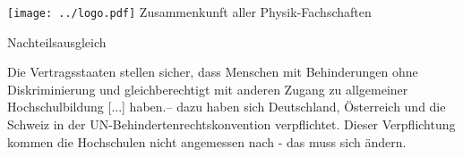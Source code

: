 \documentclass[DIV=calc]{scrartcl}
\let\oldgrqq=\grqq
\def\grqq{\oldgrqq\xspace}
\begin{document}
\hspace{0.87\textwidth}
\begin{minipage}{120pt}
\vspace{-1.8cm}
\texttt{[image: ../logo.pdf]}
\centering
\small Zusammenkunft aller Physik-Fachschaften
\end{minipage}

\begin{center}
  \huge{Nachteilsausgleich}\vspace{.25\baselineskip}\\
  \normalsize
\end{center}
\vspace{1cm}





\glqq Die Vertragsstaaten stellen sicher, dass Menschen mit Behinderungen ohne Diskriminierung und gleichberechtigt mit anderen Zugang zu allgemeiner Hochschulbildung [...] haben.\grqq -- dazu haben sich Deutschland, Österreich und die Schweiz in der UN-Behindertenrechtskonvention verpflichtet. Dieser Verpflichtung kommen die Hochschulen nicht angemessen nach - das muss sich ändern.\\
\end{document}
